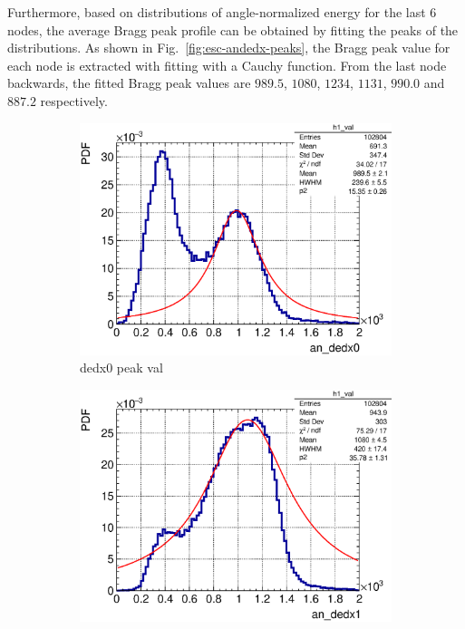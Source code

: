     Furthermore, based on distributions of angle-normalized energy for the last 6 nodes, the average Bragg peak profile can be obtained by fitting the peaks of the distributions.
    As shown in Fig.~\ref{fig:esc-andedx-peaks}, the Bragg peak value for each node is extracted with fitting with a Cauchy function.
    From the last node backwards, the fitted Bragg peak values are $989.5$, $1080$, $1234$, $1131$, $990.0$ and $887.2$ respectively.

     \begin{figure}[t]
       \centering
       \begin{subfigure}{\trfigwid\textwidth}
            \includegraphics[width=\textwidth]{figures/sel/ans_dedx0_pdf_al2_selpr_con_test.eps}
            \caption{dedx0 peak val}
            \label{subfig:dedx0-peak}
       \end{subfigure}
       \begin{subfigure}{\trfigwid\textwidth}
            \includegraphics[width=\textwidth]{figures/sel/ans_dedx1_pdf_al2_selpr_con_test.eps}

\end{subfigure}
\end{figure}
